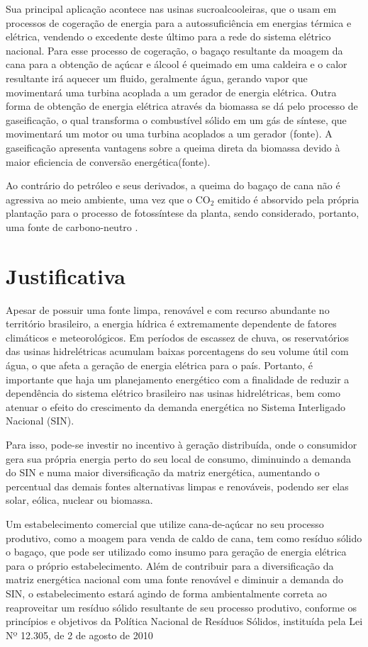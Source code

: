 Sua principal aplicação acontece nas usinas sucroalcooleiras, que o usam em processos de cogeração de energia para a autossuficiência em energias térmica e elétrica, vendendo o excedente deste último para a rede do sistema elétrico nacional. Para esse processo de cogeração, o bagaço resultante da moagem da cana para a obtenção de açúcar e álcool é queimado em uma caldeira e o calor resultante irá aquecer um fluido, geralmente água, gerando vapor que movimentará uma turbina acoplada a um gerador de energia elétrica. Outra forma de obtenção de energia elétrica através da biomassa se dá pelo processo de gaseificação, o qual transforma o combustível sólido em um gás de síntese, que movimentará um motor ou uma turbina acoplados a um gerador (fonte). A gaseificação apresenta vantagens sobre a queima direta da biomassa devido à maior eficiencia de conversão energética(fonte). 

Ao contrário do petróleo e seus derivados, a queima do bagaço de cana não é agressiva ao meio ambiente, uma vez que o CO$_2$ emitido é absorvido pela própria plantação para o processo de fotossíntese da planta, sendo considerado, portanto, uma fonte de carbono-neutro \cite{basu2010}.



\section{Justificativa}

Apesar de possuir uma fonte limpa, renovável e com recurso abundante no território brasileiro, a energia hídrica é extremamente dependente de fatores climáticos e meteorológicos. Em períodos de escassez de chuva, os reservatórios das usinas hidrelétricas acumulam baixas porcentagens do seu volume útil com água, o que afeta a geração de energia elétrica para o país. Portanto, é importante que haja um planejamento energético com a finalidade de reduzir a dependência do sistema elétrico brasileiro nas usinas hidrelétricas, bem como atenuar o efeito do crescimento da demanda energética no Sistema Interligado Nacional (SIN). 

Para isso, pode-se investir no incentivo à geração distribuída, onde o consumidor gera sua própria energia perto do seu local de consumo, diminuindo a demanda do SIN e numa maior diversificação da matriz energética, aumentando o percentual das demais fontes alternativas limpas e renováveis, podendo ser elas solar, eólica, nuclear ou biomassa. 

Um estabelecimento comercial que utilize cana-de-açúcar no seu processo produtivo, como a moagem para venda de caldo de cana, tem como resíduo sólido o bagaço, que pode ser utilizado como insumo para geração de energia elétrica para o próprio estabelecimento.  Além de contribuir para a diversificação da matriz energética nacional com uma fonte renovável e diminuir a demanda do SIN, o estabelecimento estará agindo de forma ambientalmente correta ao reaproveitar um resíduo sólido resultante de seu processo produtivo, conforme os princípios e objetivos da Política Nacional de Resíduos Sólidos, instituída pela Lei Nº 12.305, de 2 de agosto de 2010 %

